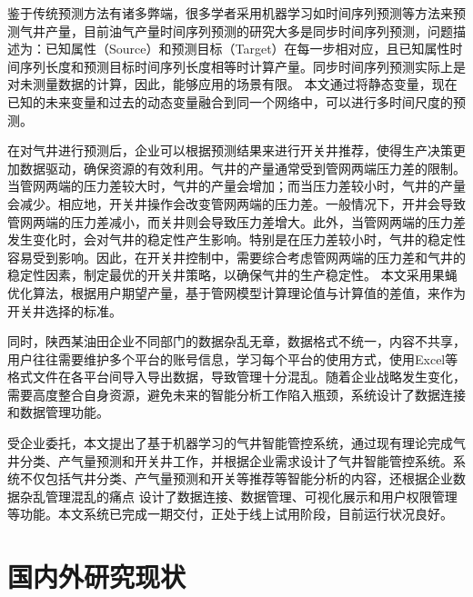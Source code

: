 鉴于传统预测方法有诸多弊端，很多学者采用机器学习如时间序列预测等方法来预测气井产量，目前油气产量时间序列预测的研究大多是同步时间序列预测，问题描述为：已知属性（Source）和预测目标（Target）在每一步相对应，且已知属性时间序列长度和预测目标时间序列长度相等时计算产量。同步时间序列预测实际上是对未测量数据的计算，因此，能够应用的场景有限。
本文通过将静态变量，现在已知的未来变量和过去的动态变量融合到同一个网络中，可以进行多时间尺度的预测。

在对气井进行预测后，企业可以根据预测结果来进行开关井推荐，使得生产决策更加数据驱动，确保资源的有效利用。气井的产量通常受到管网两端压力差的限制。当管网两端的压力差较大时，气井的产量会增加；而当压力差较小时，气井的产量会减少。相应地，开关井操作会改变管网两端的压力差。一般情况下，开井会导致管网两端的压力差减小，而关井则会导致压力差增大。此外，当管网两端的压力差发生变化时，会对气井的稳定性产生影响。特别是在压力差较小时，气井的稳定性容易受到影响。因此，在开关井控制中，需要综合考虑管网两端的压力差和气井的稳定性因素，制定最优的开关井策略，以确保气井的生产稳定性。
本文采用果蝇优化算法，根据用户期望产量，基于管网模型计算理论值与计算值的差值，来作为开关井选择的标准。

同时，陕西某油田企业不同部门的数据杂乱无章，数据格式不统一，内容不共享，用户往往需要维护多个平台的账号信息，学习每个平台的使用方式，使用Excel等格式文件在各平台间导入导出数据，导致管理十分混乱。随着企业战略发生变化，需要高度整合自身资源，避免未来的智能分析工作陷入瓶颈，系统设计了数据连接和数据管理功能。

受企业委托，本文提出了基于机器学习的气井智能管控系统，通过现有理论完成气井分类、产气量预测和开关井工作，并根据企业需求设计了气井智能管控系统。系统不仅包括气井分类、产气量预测和开关等推荐等智能分析的内容，还根据企业数据杂乱管理混乱的痛点
设计了数据连接、数据管理、可视化展示和用户权限管理等功能。本文系统已完成一期交付，正处于线上试用阶段，目前运行状况良好。

\section{国内外研究现状}
